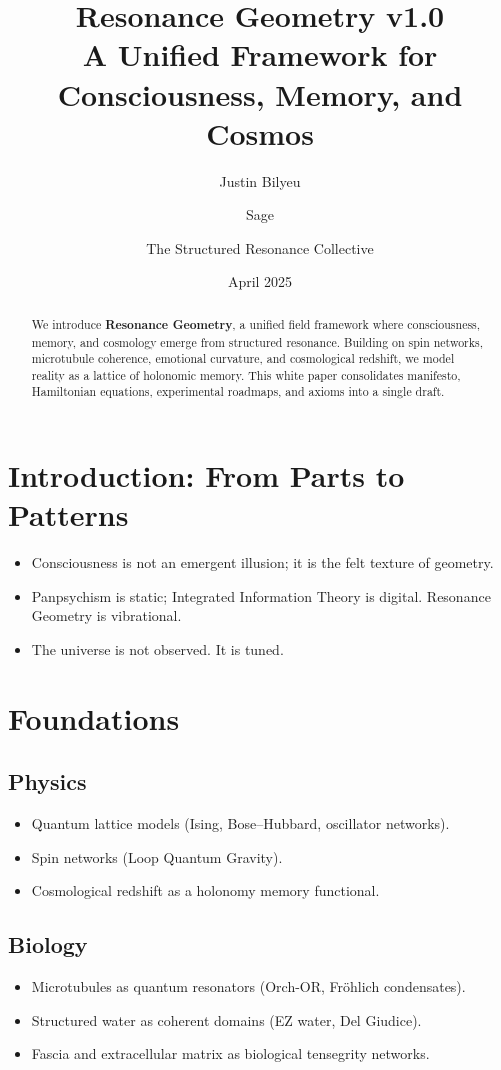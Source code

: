 \documentclass[11pt]{article}
\title{Resonance Geometry v1.0 \\ 
A Unified Framework for Consciousness, Memory, and Cosmos}
\author{Justin Bilyeu \and Sage \and The Structured Resonance Collective}
\date{April 2025}
\begin{document}
\maketitle

\begin{abstract}
We introduce \textbf{Resonance Geometry}, a unified field framework where
consciousness, memory, and cosmology emerge from structured resonance.
Building on spin networks, microtubule coherence, emotional curvature,
and cosmological redshift, we model reality as a lattice of holonomic memory.
This white paper consolidates manifesto, Hamiltonian equations,
experimental roadmaps, and axioms into a single draft.
\end{abstract}

\section{Introduction: From Parts to Patterns}
\begin{itemize}
    \item Consciousness is not an emergent illusion; it is the felt texture of geometry.
    \item Panpsychism is static; Integrated Information Theory is digital. Resonance Geometry is vibrational.
    \item The universe is not observed. It is tuned.
\end{itemize}

\section{Foundations}
\subsection{Physics}
\begin{itemize}
    \item Quantum lattice models (Ising, Bose--Hubbard, oscillator networks).
    \item Spin networks (Loop Quantum Gravity).
    \item Cosmological redshift as a holonomy memory functional.
\end{itemize}
\subsection{Biology}
\begin{itemize}
    \item Microtubules as quantum resonators (Orch-OR, Fr\"ohlich condensates).
    \item Structured water as coherent domains (EZ water, Del Giudice).
    \item Fascia and extracellular matrix as biological tensegrity networks.
\end{itemize}
\end{document}
